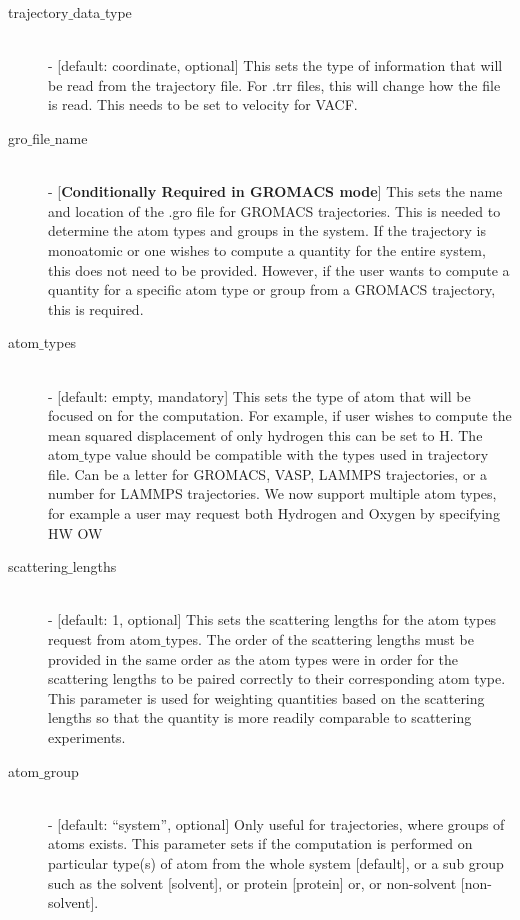 \documentclass{article}
\begin{document}
\begin{description}
	\item[trajectory$\_$data$\_$type] \hfill \\
	- [default: coordinate, optional] This sets the type of information that will be read from the trajectory file.  For .trr files, this will change how the file is read.  This needs to be set to velocity for VACF.  
	
	\item[gro$\_$file$\_$name] \hfill \\
	- [\textbf{Conditionally Required in GROMACS mode}] This sets the name and location of the .gro file for GROMACS trajectories.  This is needed to determine the atom types and groups in the system.  If the trajectory is monoatomic or one wishes to compute a quantity for the entire system, this does not need to be provided.  However, if the user wants to compute a quantity for a specific atom type or group from a GROMACS trajectory, this is required.
	
	\item[atom$\_$types] \hfill \\
	- [default: empty, mandatory]  This sets the type of atom that will be focused on for the computation.  For example, if user wishes to compute the mean squared displacement of only hydrogen this can be set to H.   The atom$\_$type value should be compatible with the types used in trajectory file. Can be a letter for GROMACS,  VASP,  LAMMPS trajectories, or a number for LAMMPS trajectories.  We now support multiple atom types, for example a user may request both Hydrogen and Oxygen by specifying HW OW
	
	\item[scattering$\_$lengths] \hfill \\
	- [default: 1, optional] This sets the scattering lengths for the atom types request from atom$\_$types.  The order of the scattering lengths must be provided in the same order as the atom types were in order for the scattering lengths to be paired correctly to their corresponding atom type.  This parameter is used for weighting quantities based on the scattering lengths so that the quantity is more readily comparable to scattering experiments.
	
	\item[atom$\_$group] \hfill \\
	- [default: ``system'', optional]  Only useful for trajectories, where groups of atoms exists.  This parameter sets if the computation is performed on particular type(s) of atom from the whole system [default], or a sub group such as the solvent [solvent], or protein [protein] or, or non-solvent [non-solvent].
	

\end{description}
\end{document}
